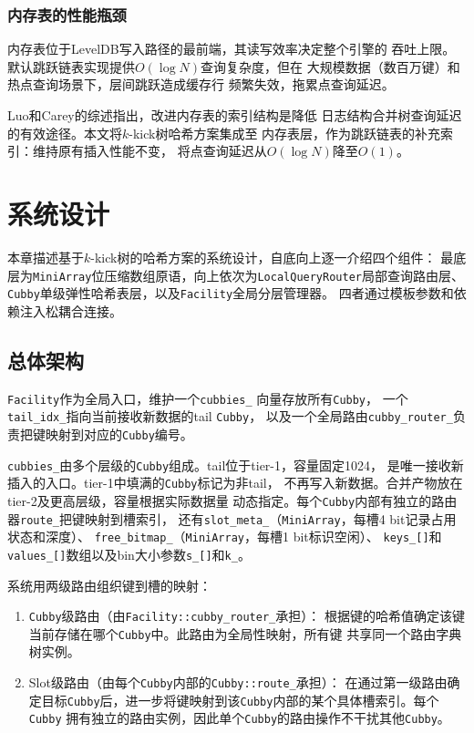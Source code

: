 \documentclass[
    type = bachelor,
    fontset = win,
    decl-page = true,
  ]{njuthesis}
\begin{document}
\subsection{内存表的性能瓶颈}

内存表位于LevelDB写入路径的最前端，其读写效率决定整个引擎的
吞吐上限。默认跳跃链表实现提供$O(\log N)$查询复杂度，但在
大规模数据（数百万键）和热点查询场景下，层间跳跃造成缓存行
频繁失效，拖累点查询延迟。

Luo和Carey的综述\cite{13}指出，改进内存表的索引结构是降低
日志结构合并树查询延迟的有效途径。本文将$k$-kick树哈希方案集成至
内存表层，作为跳跃链表的补充索引：维持原有插入性能不变，
将点查询延迟从$O(\log N)$降至$O(1)$。

\chapter{系统设计}

本章描述基于$k$-kick树的哈希方案\cite{1}的系统设计，自底向上逐一介绍四个组件：
最底层为\texttt{MiniArray}位压缩数组原语，向上依次为\texttt{LocalQueryRouter}局部查询路由层、
\texttt{Cubby}单级弹性哈希表层，以及\texttt{Facility}全局分层管理器。
四者通过模板参数和依赖注入松耦合连接。

\section{总体架构}

\texttt{Facility}作为全局入口，维护一个\texttt{cubbies\_}\newline
向量存放所有\texttt{Cubby}，
一个\texttt{tail\_idx\_}指向当前接收新数据的tail \texttt{Cubby}，
以及一个全局路由\texttt{cubby\_router\_}负责把键映射到对应的\texttt{Cubby}编号。

\texttt{cubbies\_}由多个层级的\texttt{Cubby}组成。tail位于tier-1，容量固定1024，
是唯一接收新插入的入口。tier-1中填满的\texttt{Cubby}标记为非tail，
不再写入新数据。合并产物放在tier-2及更高层级，容量根据实际数据量
动态指定。每个\texttt{Cubby}内部有独立的路由器\texttt{route\_}把键映射到槽索引，
还有\texttt{slot\_meta\_}（\texttt{MiniArray}，每槽4 bit记录占用状态和深度）、
\texttt{free\_bitmap\_}（\texttt{MiniArray}，每槽1 bit标识空闲）、
\texttt{keys\_[]}和\texttt{values\_[]}数组以及bin大小参数\texttt{s\_[]}和\texttt{k\_}。

系统用两级路由组织键到槽的映射：

\begin{enumerate}
  \item \texttt{Cubby}级路由（由\texttt{Facility::cubby\_router\_}承担）：
    根据键的哈希值确定该键当前存储在哪个\texttt{Cubby}中。此路由为全局性映射，所有键
    共享同一个路由字典树实例。
  \item Slot级路由（由每个\texttt{Cubby}内部的\texttt{Cubby::route\_}承担）：
    在通过第一级路由确定目标\texttt{Cubby}后，进一步将键映射到该\texttt{Cubby}内部的某个具体槽索引。每个\texttt{Cubby}
    拥有独立的路由实例，因此单个\texttt{Cubby}的路由操作不干扰其他\texttt{Cubby}。
\end{enumerate}
\end{document}
